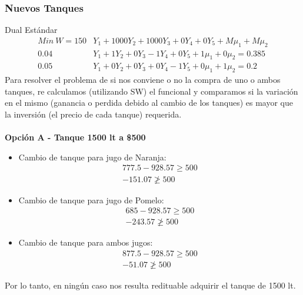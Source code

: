 \begin{homeworkProblem}[-1][Citrus]
\subsubsection{Nuevos Tanques}

Dual Estándar
\begin{align*}
  Min\ W = 150&Y_1 + 1000Y_2 + 1000Y_3 + 0Y_4 + 0Y_5 + M\mu_1 + M\mu_2 \\
  0.04&Y_1 + 1Y_2 + 0Y_3 - 1Y_4 + 0Y_5 + 1\mu_1 + 0\mu_2 = 0.385 \\
  0.05&Y_1 + 0Y_2 + 0Y_3 + 0Y_4 - 1Y_5 + 0\mu_1 + 1\mu_2 = 0.2 
\end{align*}
Para resolver el problema de si nos conviene o no la compra de uno o ambos tanques, re calculamos (utilizando SW) el funcional y comparamos si la variación en el mismo (ganancia o perdida debido al cambio de los tanques) es mayor que la inversión (el precio de cada tanque) requerida. \\ \\
\textbf{Opción A - Tanque 1500 lt a \$500} \\
\begin{itemize}
  \item Cambio de tanque para jugo de Naranja:
  \begin{align*}
    777.5 - 928.57 \ge 500 \\
    - 151.07 \ngeq 500 
  \end{align*}
  \item Cambio de tanque para jugo de Pomelo:
  \begin{align*}
    685 - 928.57 \ge 500 \\
    - 243.57 \ngeq 500 
  \end{align*}
  \item Cambio de tanque para ambos jugos:
  \begin{align*}
    877.5 - 928.57 \ge 500 \\
    - 51.07 \ngeq 500 
  \end{align*}
\end{itemize}
Por lo tanto, en ningún caso nos resulta redituable adquirir el tanque de 1500 lt.\\ \\ \\

\end{homeworkProblem}
